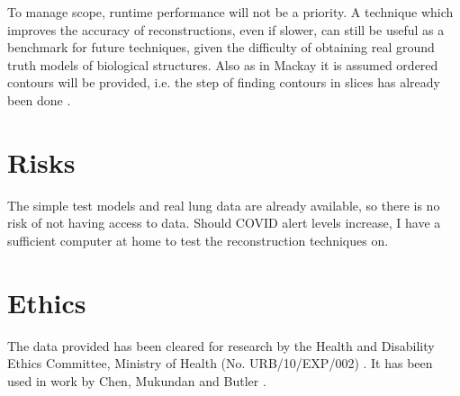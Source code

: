 \documentclass{IEEEtran}
\begin{document}
To manage scope, runtime performance will not be a priority. A technique which improves the accuracy of reconstructions, even if slower, can still be useful as a benchmark for future techniques, given the difficulty of obtaining real ground truth models of biological structures. Also as in Mackay it is assumed ordered contours will be provided, i.e. the step of finding contours in slices has already been done \cite{mukundan2016reconstruction}.

\section{Risks}
The simple test models and real lung data are already available, so there is no risk of not having access to data. Should COVID alert levels increase, I have a sufficient computer at home to test the reconstruction techniques on.

\section{Ethics}
The data provided has been cleared for research by the Health and Disability Ethics Committee, Ministry of Health (No. URB/10/EXP/002) \cite{health2010annual}. It has been used in work by Chen, Mukundan and Butler \cite{chen2011automatic}.

\pagebreak


\end{document}
